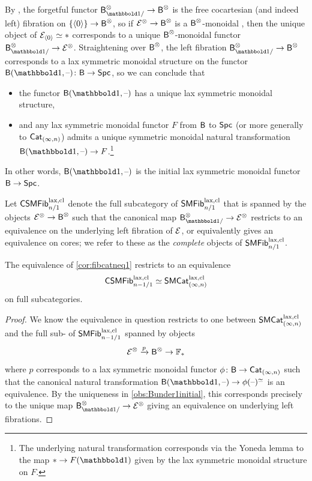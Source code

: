 \documentclass[a4paper,11pt]{article}
\begin{document}
\begin{observation}\label{obs:Bunder1initial}
  By \cite[Theorem 1.2]{freepres}, the forgetful functor
  $\oB_{\bbone/}^{\otimes} \to \oB^{\otimes}$ is the free cocartesian
  (and indeed left) fibration on $\{\angled{0}\} \to \oB^{\otimes}$,
  so if $\eE^{\otimes} \to \oB^{\otimes}$ is a
  $\textup{\textsf{B}}^{\otimes}$-monoidal \incat{}, then the unique object of
  $\mathcal{E}_{\langle 0 \rangle} \simeq *$ corresponds to a unique
  $\textup{\textsf{B}}^{\otimes}$-monoidal functor
  $\oB_{\bbone/}^{\otimes} \to \nE^{\otimes}$. Straightening over
  $\textup{\textsf{B}}^{\otimes}$, the left fibration
  $\oB_{\bbone/}^{\otimes} \to \oB^{\otimes}$ corresponds to a lax
  symmetric monoidal structure on the functor
  $\oB(\bbone, \blank) \colon \oB \to \Spc$, so we can conclude that
  \begin{itemize}
  \item the functor $\oB(\bbone,\blank)$ has a unique lax symmetric
    monoidal structure,
  \item and any lax symmetric monoidal functor $F$ from $\textup{\textsf{B}}$ to $\textup{\textsf{Spc}}$ (or
    more generally to $\textup{\textsf{Cat}}_{(\infty,n)}$) admits a unique symmetric monoidal
    natural transformation $\oB(\bbone, \blank) \to
    F$.\footnote{The underlying natural transformation corresponds
      via the Yoneda lemma to the map $* \to F(\bbone)$ given by the
      lax symmetric monoidal structure on $F$.}
  \end{itemize}
  In other words, $\oB(\bbone,\blank)$ is the initial lax symmetric
  monoidal functor $\oB \to \Spc$.
\end{observation}

\begin{notation}
  Let $\textup{\textsf{CSMFib}}^{\text{\textup{lax}},\text{\textup{cl}}}_{n/1}$ denote the full subcategory of
  $\textup{\textsf{SMFib}}^{\text{\textup{lax}},\text{\textup{cl}}}_{n/1}$ that is spanned by the objects
  $\nE^{\otimes} \to \oB^{\otimes}$ such that the canonical map
  $\oB_{\bbone/}^{\otimes} \to \nE^{\otimes}$ restricts to an
  equivalence on the underlying left fibration of $\mathcal{E}$, or
  equivalently gives an equivalence on \igpd{} cores; we refer to
  these as the \emph{complete} objects of $\textup{\textsf{SMFib}}^{\text{\textup{lax}},\text{\textup{cl}}}_{n/1}$.
\end{notation}

\begin{cor}\label{cor:fibcatneq}
  The equivalence of \cref{cor:fibcatneq1} restricts to 
  an equivalence
  \[ \textup{\textsf{CSMFib}}^{\text{\textup{lax}},\text{\textup{cl}}}_{n-1/1} \simeq \textup{\textsf{SMCat}}_{(\infty,n)}^{\text{\textup{lax}},\text{\textup{cl}}}\]
  on full subcategories.
\end{cor}
\begin{proof}
  We know the equivalence in question restricts to one between
  $\textup{\textsf{SMCat}}_{(\infty,n)}^{\text{\textup{lax}},\text{\textup{cl}}}$ and the
  full sub-\itcat{} of $\textup{\textsf{SMFib}}^{\text{\textup{lax}},\text{\textup{cl}}}_{n-1/1}$ spanned by objects
  \[ \nE^{\otimes} \xto{p} \oB^{\otimes} \to \xF_{*}\]
  where $p$ corresponds to a lax symmetric monoidal functor $\phi
  \colon \oB \to
  \CatIn$ such that the canonical natural transformation
  $\oB(\bbone,\blank) \to \phi(\blank)^{\simeq}$ is an
  equivalence. By the uniqueness in \cref{obs:Bunder1initial}, this corresponds precisely
  to the unique map $\oB_{\bbone/}^{\otimes} \to \nE^{\otimes}$ giving an
  equivalence on underlying left fibrations.
\end{proof}
\end{document}
